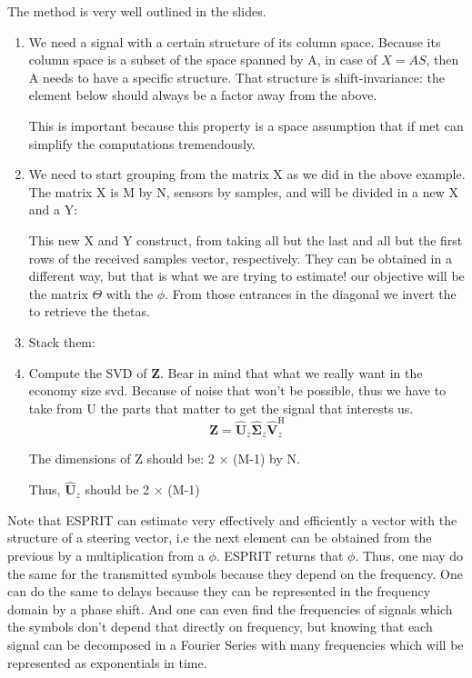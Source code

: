 \documentclass[12pt, a4paper]{article}
\begin{document}
\par The method is very well outlined in the slides. 
\begin{enumerate}
    \item We need a signal with a certain structure of its column space. Because its column space is a subset of the space spanned by A, in case of $X = AS$, then A needs to have a specific structure. That structure is shift-invariance: the element below should always be a factor away from the above.
    

    This is important because this property is a space assumption that if met can simplify the computations tremendously.

    \item We need to start grouping from the matrix X as we did in the above example. The matrix X is M by N, sensors by samples, and will be divided in a new X and a Y:
    

    \par This new X and Y construct, from taking all but the last and all but the first rows of the received samples vector, respectively. They can be obtained in a different way, but that is what we are trying to estimate!
    our objective will be the matrix $\Theta$ with the $\phi$. From those entrances in the diagonal we invert the to retrieve the thetas.

    \item Stack them: 
    \item Compute the SVD of $\mathbf{Z}$.  Bear in mind that what we really want in the economy size svd. Because of noise that won't be possible, thus we have to take from U the parts that matter to get the signal that interests us.
    \begin{equation}
        \mathbf{Z} = \mathbf{\hat{U}}_z \mathbf{\hat{\Sigma}}_z \mathbf{\hat{V}}^\text{H}_z
    \end{equation}

    \par The dimensions of Z should be: 2 $\times$ (M-1) by N.
    \par Thus, $\mathbf{\hat{U}}_z$ should be 2 $\times$ (M-1) 
\end{enumerate}


Note that ESPRIT can estimate very effectively and efficiently a vector with the structure of a steering vector, i.e the next element can be obtained from the previous by a multiplication from a $\phi$. ESPRIT returns that $\phi$. Thus, one may do the same for the transmitted symbols because they depend on the frequency. One can do the same to delays because they can be represented in the frequency domain by a phase shift. And one can even find the frequencies of signals which the symbols don't depend that directly on frequency, but knowing that each signal can be decomposed in a Fourier Series with many frequencies which will be represented as exponentials in time.
\end{document}
